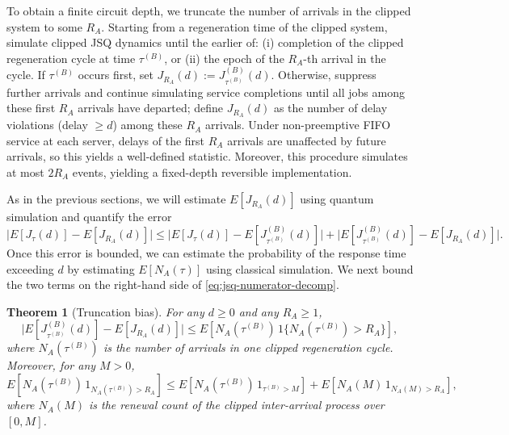 \documentclass[11pt]{article}
\newcommand{\E}{E}
\newtheorem{theorem}{Theorem}
\begin{document}
To obtain a finite circuit depth, we truncate the number of arrivals in the clipped system to
some $R_A$. Starting from a regeneration time of the clipped system, simulate
clipped JSQ dynamics until the earlier of:
(i) completion of the clipped regeneration cycle at time $\tau^{(B)}$, or
(ii) the epoch of the $R_A$-th arrival in the cycle.
If $\tau^{(B)}$ occurs first, set $J_{R_A}(d):=J_{\tau^{(B)}}^{(B)}(d)$.
Otherwise, suppress further arrivals and continue simulating service completions
until all jobs among these first $R_A$ arrivals have departed; define $J_{R_A}(d)$
as the number of delay violations (delay $\ge d$) among these $R_A$ arrivals.
Under non-preemptive FIFO service at each server, delays of the first $R_A$
arrivals are unaffected by future arrivals, so this yields a well-defined statistic.
Moreover, this procedure simulates at most $2R_A$ events, yielding a fixed-depth
reversible implementation.

As in the previous sections, we will estimate $E[J_{R_A}(d)]$ using quantum simulation and quantify the error
\begin{equation}
\label{eq:jsq-numerator-decomp}
\bigl|\E[J_\tau(d)]-\E[J_{R_A}(d)]\bigr|
\le
\bigl|\E[J_\tau(d)]-\E[J_{\tau^{(B)}}^{(B)}(d)]\bigr|
+
\bigl|\E[J_{\tau^{(B)}}^{(B)}(d)]-\E[J_{R_A}(d)]\bigr|.
\end{equation}
Once this error is bounded, we can estimate the probability of the response time exceeding $d$ by estimating $E[N_A(\tau)]$ using classical simulation.
We next bound the two terms on the right-hand side of
\eqref{eq:jsq-numerator-decomp}.

\begin{theorem}[Truncation bias]
\label{thm:jsq-arrivalcap-bias}
For any $d\ge 0$ and any $R_A\ge 1$,
\begin{equation}
\label{eq:jsq-arrivalcap-bias}
\bigl|\E[J_{\tau^{(B)}}^{(B)}(d)]-\E[J_{R_A}(d)]\bigr|
\le
\E\!\left[N_A(\tau^{(B)})\, 1\{N_A(\tau^{(B)})>R_A\}\right],
\end{equation}
where $N_A(\tau^{(B)})$ is the number of arrivals in one clipped regeneration cycle.
Moreover, for any $M>0$,
\begin{equation}
\label{eq:jsq-arrivalcap-bias-decomp}
\E\!\left[N_A(\tau^{(B)})\, 1_{N_A(\tau^{(B)})>R_A}\right]
\le
\E\!\left[N_A(\tau^{(B)})\,1_{\tau^{(B)}>M}\right]
+
\E\!\left[N_A(M)\,1_{N_A(M)>R_A}\right],
\end{equation}
where $N_A(M)$ is the renewal count of the clipped inter-arrival process over $[0,M]$.
\end{theorem}
\end{document}
